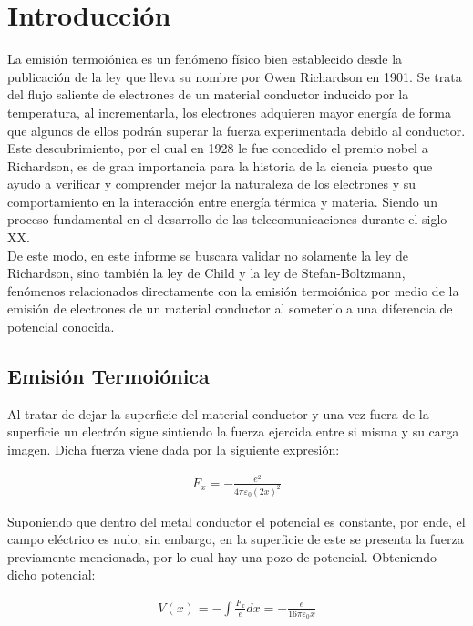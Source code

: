\documentclass[%
 reprint,
 amsmath,amssymb,
 aps,
]{revtex4-2}
\begin{document}
\section{Introducción}

La emisión termoiónica es un fenómeno físico bien establecido desde la publicación de la ley que lleva su nombre por Owen Richardson en 1901. Se trata del flujo saliente de electrones de un material conductor inducido por la temperatura, al incrementarla, los electrones adquieren mayor energía de forma que algunos de ellos podrán superar la fuerza experimentada debido al conductor.
\\

Este descubrimiento, por el cual en 1928 le fue concedido el premio nobel a Richardson, es de gran importancia para la historia de la ciencia puesto que ayudo a verificar y comprender mejor la naturaleza de los electrones y su comportamiento en la interacción entre energía térmica y materia. Siendo un proceso fundamental en el desarrollo de las telecomunicaciones durante el siglo XX.
\\

De este modo, en este informe se buscara validar no solamente la ley de Richardson, sino también la ley de Child y la ley de Stefan-Boltzmann, fenómenos relacionados directamente con la emisión termoiónica por medio de la emisión de electrones de un material conductor al someterlo a una diferencia de potencial conocida.

\subsection{Emisión Termoiónica}

Al tratar de dejar la superficie del material conductor y una vez fuera de la superficie un electrón sigue sintiendo la fuerza ejercida entre si misma y su carga imagen. Dicha fuerza viene dada por la siguiente expresión:

\begin{align*}
    F_{x}= -\frac{e^{2}}{4\pi \varepsilon_{0}(2x)^{2}}
\end{align*}

\vspace{0.2 cm}
Suponiendo que dentro del metal conductor el potencial es constante, por ende, el campo eléctrico es nulo; sin embargo, en la superficie de este se presenta la fuerza previamente mencionada, por lo cual hay una pozo de potencial. Obteniendo dicho potencial:

\begin{align}
    \label{pot1}
    V(x) = -\int \frac{F_{x}}{e}dx = -\frac{e}{16\pi \varepsilon_{0}x}
\end{align}
\end{document}
